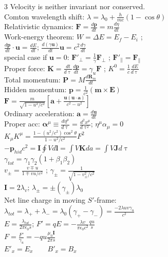 \documentclass[a4paper,twoside]{article}
\begin{document}
\begin{multicols*}{3}
Velocity is neither invariant nor conserved.\\
Comton wavelength shift: \(\lambda = \lambda_0 + \frac{h}{mc}(1-\cos \theta)\)\\
Relativistic dynamics: \(\bm F = \frac{d\bm p}{dt} = m \frac{d\eta}{dt}\)\\
Work-energy theorem: \(W = \Delta E = E_f - E_i\) ;\\
\(\frac{d\bm p}{dt} \cdot \bm u = \frac{dE}{dt}\); \(\frac{d(\gamma \bm u)}{dt}\bm u = c^2\frac{d\gamma}{dt}\)\\
special case if \(\bm u = 0\): \(\bm F'_{\perp} = \frac{1}{\gamma} \bm F_{\perp}\) ; \(\bm F'_{\parallel} = \bm F_{\parallel}\)\\
Proper force: \(\bm K = \frac{dt}{d\uptau} \frac{d\bm p}{dt} = \gamma_u \bm F\) ; \(K^0 = \frac{1}{c} \frac{dE}{d\uptau}\)\\
Total momentum: \(\bm P = M \frac{d \bm R_m}{dt}\)\\
Hidden momentum: \(\bm p = \frac{1}{c^2} (\bm m\times \bm E )\)\\
\(\bm F = \frac{m}{\sqrt{1-u^2/c^2}}[\bm a + \frac{\bm u (\bm u \cdot \bm a)}{c^2-u^2}]\)\\
Ordinary acceleration: \(\bm a = \frac{d\bm u}{dt}\)\\
Proper acc: \(\bm \alpha^\mu \equiv \frac{d\eta^\mu}{d \uptau} = \frac{d^2 x^\mu}{d \uptau^2}\); \(\eta^\mu \alpha_\mu = 0\)\\
\(K_\mu K^\mu = \frac{1 - (u^2/c^2) \cos^2 \theta}{1 - u^2/c^2} F^2 \)\\
\(-\bm p_{hid} c^2 = \bm I \oint V d\bm l = \int V \bm K da =  \int V \bm J d\uptau\)\\
\(\gamma_{tot} = \gamma_1 \gamma_2 (1 + \beta_1 \beta_2)\)\\
\(v_\pm = \frac{v \mp u}{1 \mp vu/c^2}\) ; \(\gamma_\pm = \frac{1}{\sqrt{1 - v_\pm^2/c^2}}\)\\
\(\bm I = 2 \lambda_v \); \(\lambda_\pm = \pm (\gamma_\pm) \lambda_0\)\\
Net line charge in moving \(S'\)-frame:\\
\(\lambda_{tot} = \lambda_+ + \lambda_- = \lambda_0 (\gamma_+ - \gamma_-) = \frac{-2 \lambda uv\gamma_u}{c^2}\)\\
\(E = \frac{\lambda_{tot}}{2 \pi \epsilon_0 s}\); \(F' = qE = - \frac{\lambda v}{\pi \epsilon_0 c^2} \frac{qu}{s}\)\\
\(F = \frac{F'}{\gamma_u} = -qu \frac{\mu_0 \bm I}{2 \pi s}\)\\
\(E'_x = E_x \qquad B'_x = B_x \)\\

\end{multicols*}
\end{document}
